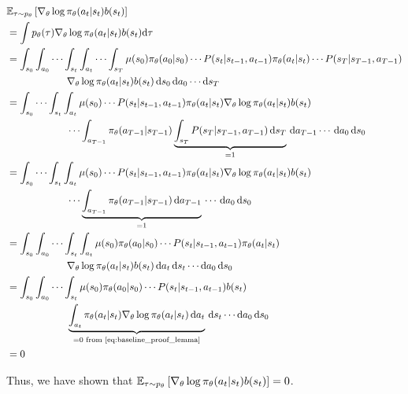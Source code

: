 \documentclass{article}
\begin{document}
\begin{tcolorbox}[breakable,enhanced,colback=gray!10!white,colframe=gray!50!black,
title={$\BBE_{\tau \sim p_\theta} \left[\nabla_\theta \log \pi_\theta(a_t \vert s_t) b(s_t)\right] = 0$}]
\begin{align*}
&\BBE_{\tau \sim p_\theta} \left[\nabla_\theta \log \pi_\theta(a_t \vert s_t) b(s_t)\right] \\
%
&= \int p_\theta(\tau) \nabla_\theta \log \pi_\theta(a_t \vert s_t) b(s_t) \dtau \\
%
&= \int_{s_0} \int_{a_0} \cdots \int_{s_t} \int_{a_t} \cdots \int_{s_T} \mu(s_0) \pi_\theta(a_0 \vert s_0) \cdots P(s_t \vert s_{t-1}, a_{t-1}) \pi_\theta(a_t \vert s_t) \cdots P(s_T \vert s_{T-1}, a_{T-1}) \\
&\qquad \qquad \qquad \nabla_\theta \log \pi_\theta(a_t \vert s_t) b(s_t) \, \ds_0 \, \da_0 \cdots \ds_T \\
%
&= \int_{s_0} \cdots \int_{s_t} \int_{a_t} \mu(s_0) \cdots P(s_t \vert s_{t-1}, a_{t-1}) \pi_\theta(a_t \vert s_t) \nabla_\theta \log \pi_\theta(a_t \vert s_t) b(s_t) \\
&\qquad \qquad \qquad \cdots \int_{a_{T-1}} \pi_\theta(a_{T-1} \vert s_{T-1}) \underbrace{\int_{s_T} P(s_T \vert s_{T-1}, a_{T-1})\,\ds_T}_{=1} \, \da_{T-1} \cdots \, \da_0 \, \ds_0 \\
% 
&= \int_{s_0} \cdots \int_{s_t} \int_{a_t} \mu(s_0) \cdots P(s_t \vert s_{t-1}, a_{t-1}) \pi_\theta(a_t \vert s_t) \nabla_\theta \log \pi_\theta(a_t \vert s_t) b(s_t) \\
&\qquad \qquad \qquad \cdots  \underbrace{\int_{a_{T-1}} \pi_\theta(a_{T-1} \vert s_{T-1}) \, \da_{T-1}}_{=1} \,  \cdots \, \da_0 \, \ds_0 \\
% 
&= \int_{s_0} \int_{a_0} \cdots \int_{s_t} \int_{a_t} \mu(s_0) \pi_\theta(a_0 \vert s_0) \cdots P(s_t \vert s_{t-1}, a_{t-1}) \pi_\theta(a_t \vert s_t) \\
&\qquad \qquad \qquad \nabla_\theta \log \pi_\theta(a_t \vert s_t) b(s_t) \, \da_t \, \ds_t \cdots \da_0 \, \ds_0 \\
% 
&= \int_{s_0} \int_{a_0} \cdots \int_{s_t} \mu(s_0) \pi_\theta(a_0 \vert s_0) \cdots P(s_t \vert s_{t-1}, a_{t-1}) b(s_t) \\
&\qquad \qquad \qquad \underbrace{\int_{a_t} \pi_\theta(a_t \vert s_t) \nabla_\theta \log \pi_\theta(a_t \vert s_t) \, \da_t}_{=0 \text{ from~\eqref{eq:baseline_proof_lemma}}} \, \ds_t \cdots \da_0 \, \ds_0 \\
&=0
\end{align*}
\end{tcolorbox}
Thus, we have shown that \(\BBE_{\tau \sim p_\theta} \left[\nabla_\theta \log \pi_\theta(a_t \vert s_t) b(s_t)\right] = 0 \).
\end{document}
